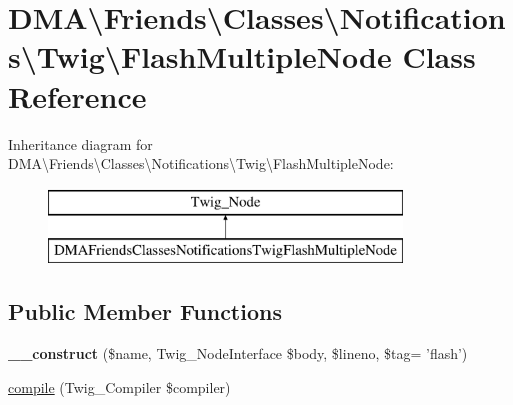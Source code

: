 \hypertarget{classDMA_1_1Friends_1_1Classes_1_1Notifications_1_1Twig_1_1FlashMultipleNode}{\section{D\+M\+A\textbackslash{}Friends\textbackslash{}Classes\textbackslash{}Notifications\textbackslash{}Twig\textbackslash{}Flash\+Multiple\+Node Class Reference}
\label{classDMA_1_1Friends_1_1Classes_1_1Notifications_1_1Twig_1_1FlashMultipleNode}
}
Inheritance diagram for D\+M\+A\textbackslash{}Friends\textbackslash{}Classes\textbackslash{}Notifications\textbackslash{}Twig\textbackslash{}Flash\+Multiple\+Node\+:\begin{figure}[H]
\begin{center}
\leavevmode
\includegraphics[height=2.000000cm]{db/dab/classDMA_1_1Friends_1_1Classes_1_1Notifications_1_1Twig_1_1FlashMultipleNode}
\end{center}
\end{figure}
\subsection*{Public Member Functions}
\begin{DoxyCompactItemize}
\item 
\hypertarget{classDMA_1_1Friends_1_1Classes_1_1Notifications_1_1Twig_1_1FlashMultipleNode_a24c16c7fcf28befcf22abe1a793929f0}{{\bfseries \+\_\+\+\_\+construct} (\$name, Twig\+\_\+\+Node\+Interface \$body, \$lineno, \$tag= 'flash')}\label{classDMA_1_1Friends_1_1Classes_1_1Notifications_1_1Twig_1_1FlashMultipleNode_a24c16c7fcf28befcf22abe1a793929f0}

\item 
\hyperlink{classDMA_1_1Friends_1_1Classes_1_1Notifications_1_1Twig_1_1FlashMultipleNode_ac6bd08da54fa162093a87dcabd1bef65}{compile} (Twig\+\_\+\+Compiler \$compiler)
\end{DoxyCompactItemize}


